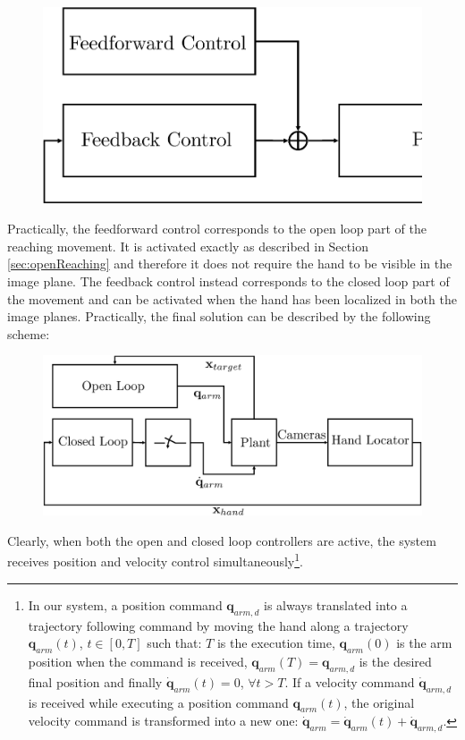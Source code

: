 \begin{figure}[th!]
\begin{center}
\includegraphics[scale = 0.25]{Figure/OpenVSClosedLoop.eps}
\end{center}
\end{figure}

Practically, the feedforward control corresponds to the open loop part of the reaching movement.
It is activated exactly as described in Section \ref{sec:openReaching} and therefore it does not
require the hand to be visible in the image plane. The feedback control
instead corresponds to the closed loop part of the movement and can be activated when the hand
has been localized in both the image planes. Practically, the final solution can be described by the 
following scheme:

\begin{figure}[th!]
\begin{center}
\includegraphics[scale = 0.25]{Figure/OpenVSClosedLoopSwitch.eps}
\end{center}
\end{figure}

Clearly, when both the open and closed loop controllers are active, the system receives position 
and velocity control simultaneously\footnote{In our system, a position command ${\mathbf q}_{arm,d}$ is 
always translated into a trajectory following command by moving 
the hand along a trajectory $\mathbf q_{arm}(t)$, $t \in [0, T]$ such that: $T$ is the execution time,
$\mathbf q_{arm}(0)$ is the arm position when the command is received, $\mathbf q_{arm}(T) = {\mathbf q}_{arm,d}$
is the desired final position and finally $\dot {\mathbf q}_{arm}(t) = 0$, $ \forall t > T$. If a velocity command $\dot {\mathbf q}_{arm,d}$ is received while executing a position
command $\mathbf q_{arm}(t)$, the original velocity command is transformed into a new one:
$\dot {\mathbf q}_{arm} = \dot {\mathbf q}_{arm}(t) + \dot {\mathbf q}_{arm, d}$.}. 

